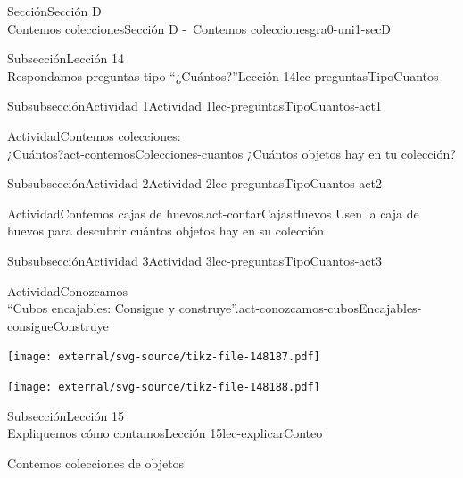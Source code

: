 \begin{sectionptx}{Sección}{{\Large Sección D\\}Contemos colecciones}{}{Sección D -~Contemos colecciones}{}{}{gra0-uni1-secD}
\begin{subsectionptx}{Subsección}{{\normalsize Lección 14\\[-0.05cm]}Respondamos preguntas tipo “¿Cuántos?”}{}{Lección 14}{}{}{lec-preguntasTipoCuantos}
\begin{subsubsectionptx}{Subsubsección}{Actividad 1}{}{Actividad 1}{}{}{lec-preguntasTipoCuantos-act1}
\begin{activity}{Actividad}{Contemos colecciones:\\¿Cuántos?}{act-contemosColecciones-cuantos}%
¿Cuántos objetos hay en tu colección?%
\end{activity}%
\end{subsubsectionptx}
%
%
\typeout{************************************************}
\typeout{************************************************}
%
\begin{subsubsectionptx}{Subsubsección}{Actividad 2}{}{Actividad 2}{}{}{lec-preguntasTipoCuantos-act2}
\begin{activity}{Actividad}{Contemos cajas de huevos.}{act-contarCajasHuevos}%
Usen la caja de huevos para descubrir cuántos objetos hay en su colección%
\end{activity}%
\end{subsubsectionptx}
%
%
\typeout{************************************************}
\typeout{************************************************}
%
\clearpage
\begin{subsubsectionptx}{Subsubsección}{Actividad 3}{}{Actividad 3}{}{}{lec-preguntasTipoCuantos-act3}
\begin{activity}{Actividad}{Conozcamos\\“Cubos encajables: Consigue y construye”.}{act-conozcamos-cubosEncajables-consigueConstruye}%
\begin{image}{0}{1}{0}{}%
\texttt{[image: external/svg-source/tikz-file-148187.pdf]}
\end{image}%
\begin{image}{0}{1}{0}{}%
\texttt{[image: external/svg-source/tikz-file-148188.pdf]}
\end{image}%
\end{activity}%
\end{subsubsectionptx}
\end{subsectionptx}
%
%
\typeout{************************************************}
\typeout{************************************************}
%
\begin{subsectionptx}{Subsección}{{\normalsize Lección 15\\[-0.05cm]}Expliquemos cómo contamos}{}{Lección 15}{}{}{lec-explicarConteo}
\begin{introduction}{}%
Contemos colecciones de objetos%
\end{introduction}%
%
%
\typeout{************************************************}

\end{subsectionptx}
\end{sectionptx}
